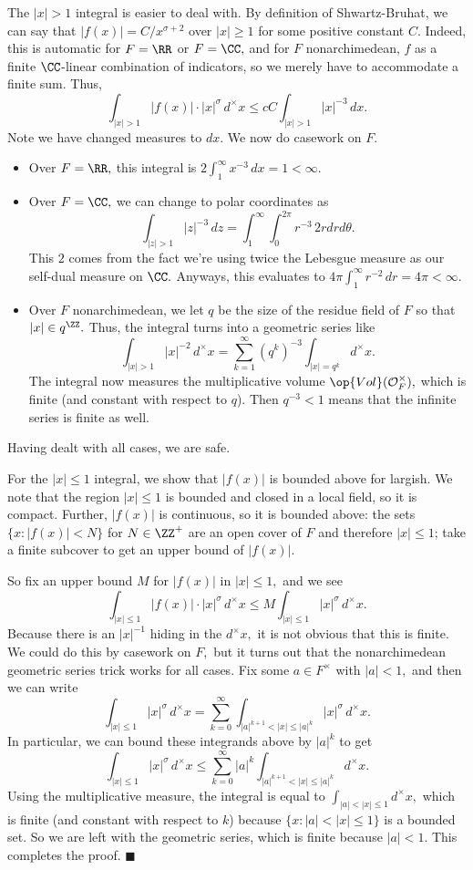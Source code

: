 The $|x|>1$ integral is easier to deal with. By definition of Shwartz-Bruhat, we can say that $|f(x)|=C/x^{\sigma+2}$ over $|x|\ge1$ for some positive constant $C.$ Indeed, this is automatic for $F=\RR$ or $F=\CC,$ and for $F$ nonarchimedean, $f$ as a finite $\CC$-linear combination of indicators, so we merely have to accommodate a finite sum. Thus,
\[\int_{|x|>1}|f(x)|\cdot|x|^\sigma\,d^\times x\le cC\int_{|x|>1}|x|^{-3}\,dx.\]
Note we have changed measures to $dx.$ We now do casework on $F.$
\begin{itemize}
    \item Over $F=\RR,$ this integral is $2\int_1^\infty x^{-3}\,dx=1<\infty.$
    \item Over $F=\CC,$ we can change to polar coordinates as
    \[\int_{|z|>1}|z|^{-3}\,dz=\int_1^\infty\int_0^{2\pi}r^{-3}\,2rdrd\theta.\]
    This $2$ comes from the fact we're using twice the Lebesgue measure as our self-dual measure on $\CC.$ Anyways, this evaluates to $4\pi\int_1^\infty r^{-2}\,dr=4\pi<\infty.$
    \item Over $F$ nonarchimedean, we let $q$ be the size of the residue field of $F$ so that $|x|\in q^\ZZ.$ Thus, the integral turns into a geometric series like
    \[\int_{|x|>1}|x|^{-2}\,d^\times x=\sum_{k=1}^\infty\left(q^k\right)^{-3}\int_{|x|=q^k}d^\times x.\]
    The integral now measures the multiplicative volume $\op{Vol}(\mathcal O_F^\times),$ which is finite (and constant with respect to $q$). Then $q^{-3}<1$ means that the infinite series is finite as well.
\end{itemize}
Having dealt with all cases, we are safe.

For the $|x|\le1$ integral, we show that $|f(x)|$ is bounded above for largish. We note that the region $|x|\le1$ is bounded and closed in a local field, so it is compact. Further, $|f(x)|$ is continuous, so it is bounded above: the sets $\{x:|f(x)|<N\}$ for $N\in\ZZ^+$ are an open cover of $F$ and therefore $|x|\le1$; take a finite subcover to get an upper bound of $|f(x)|.$

So fix an upper bound $M$ for $|f(x)|$ in $|x|\le1,$ and we see
\[\int_{|x|\le1}|f(x)|\cdot|x|^\sigma\,d^\times x\le M\int_{|x|\le1}|x|^\sigma\,d^\times x.\]
Because there is an $|x|^{-1}$ hiding in the $d^\times x,$ it is not obvious that this is finite. We could do this by casework on $F,$ but it turns out that the nonarchimedean geometric series trick works for all cases. Fix some $a\in F^\times$ with $|a|<1,$ and then we can write
\[\int_{|x|\le1}|x|^\sigma\,d^\times x=\sum_{k=0}^\infty\int_{|a|^{k+1}<|x|\le|a|^k}|x|^\sigma\,d^\times x.\]
In particular, we can bound these integrands above by $|a|^k$ to get
\[\int_{|x|\le1}|x|^\sigma\,d^\times x\le\sum_{k=0}^\infty|a|^k\int_{|a|^{k+1}<|x|\le|a|^k}d^\times x.\]
Using the multiplicative measure, the integral is equal to $\int_{|a|<|x|\le1}d^\times x,$ which is finite (and constant with respect to $k$) because $\{x:|a|<|x|\le1\}$ is a bounded set. So we are left with the geometric series, which is finite because $|a|<1.$ This completes the proof. $\blacksquare$

